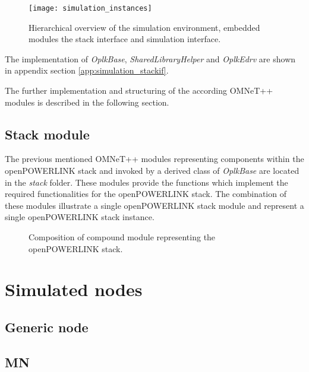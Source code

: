 \begin{figure}
    \centering
    \texttt{[image: simulation\_instances]}
    \caption{Hierarchical overview of the simulation environment, embedded modules the stack interface and simulation interface.}
    \label{fig:simulation_instances}
\end{figure}

The implementation of \emph{OplkBase}, \emph{SharedLibraryHelper} and \emph{OplkEdrv} are shown in appendix section \ref{app:simulation_stackif}.

The further implementation and structuring of the according OMNeT++ modules is described in the following section.

\subsection{Stack module}
\label{sec:porting_stack_stackmodule}

The previous mentioned OMNeT++ modules representing components within the openPOWERLINK stack and invoked by a derived class of \emph{OplkBase} are located in the \emph{stack} folder.
These modules provide the functions which implement the required functionalities for the openPOWERLINK stack.
The combination of these modules illustrate a single openPOWERLINK stack module and represent a single openPOWERLINK stack instance.

\begin{figure}
    \centering
    \caption{Composition of compound module representing the openPOWERLINK stack.}
    \label{fig:simulation_stack_module}
\end{figure}


\section{Simulated nodes}
\label{sec:porting_nodes}

\subsection{Generic node}
\label{sec:porting_nodes_generic}

\subsection{MN}
\label{sec:porting_nodes_mn}

